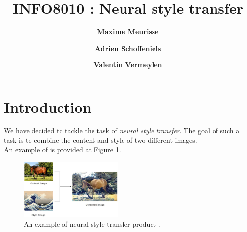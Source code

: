 \documentclass[twocolumn,superscriptaddress,aps]{revtex4-1}
\begin{document}
    
    \title{\Large{INFO8010 : Neural style transfer}}
    \vspace{1cm}
    
    \author{\small{\bf Maxime Meurisse}}
    
    \author{\small{\bf Adrien Schoffeniels}}
    
    \author{\small{\bf Valentin Vermeylen}}
    
    \maketitle
    
    
    
    
    \section{Introduction}
    
    We have decided to tackle the task of \emph{neural style transfer}. The goal of such a task is to combine the content and style of two different images.\\
    
    An example of is provided at Figure \ref{fig:example}.
    
    \begin{figure}[h]
        \centering
        \includegraphics[width=0.45\textwidth]{resources/png/example.png}
        \caption{An example of neural style transfer product \cite{towards-data-science-img}.}
        \label{fig:example}
    \end{figure}
    
\end{document}
